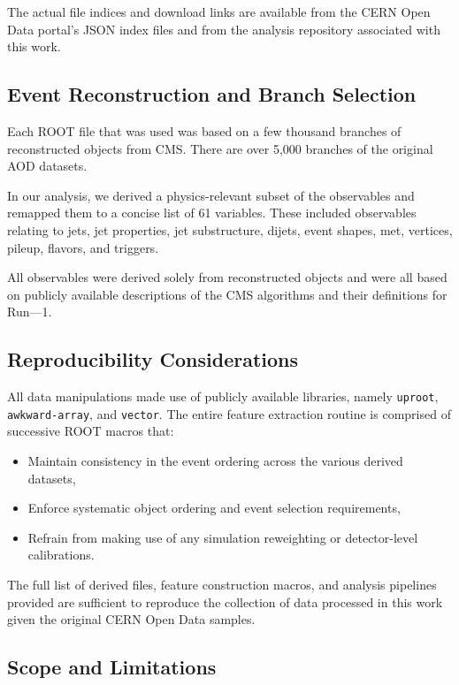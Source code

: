 \documentclass[11pt,a4paper,twocolumn]{article}
\begin{document}
The actual file indices and download links are available from the CERN Open Data portal's JSON index files and from the analysis repository associated with this work.

\subsection{Event Reconstruction and Branch Selection}

Each ROOT file that was used was based on a few thousand branches of reconstructed objects from CMS.
There are over 5,000 branches of the original AOD datasets.

In our analysis, we derived a physics-relevant subset of the observables and remapped them to a concise list of 61 variables.
These included observables relating to jets, jet properties, jet substructure, dijets, event shapes, met, vertices, pileup, flavors, and triggers.

All observables were derived solely from reconstructed objects and were all based on publicly available descriptions of the CMS algorithms and their definitions for Run---1.

\subsection{Reproducibility Considerations}

All data manipulations made use of publicly available libraries, namely \texttt{uproot}, \texttt{awkward-array}, and \texttt{vector}.
The entire feature extraction routine is comprised of successive ROOT macros that:
\begin{itemize}
    \item Maintain consistency in the event ordering across the various derived datasets,
    \item Enforce systematic object ordering and event selection requirements,
    \item Refrain from making use of any simulation reweighting or detector-level calibrations.
\end{itemize}

The full list of derived files, feature construction macros, and analysis pipelines provided are sufficient to reproduce the collection of data processed in this work given the original CERN Open Data samples.

\subsection{Scope and Limitations}
\end{document}
